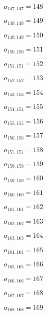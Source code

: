 \documentclass[a4paper,12pt]{article}
\begin{document}
$a _{ 147, 147 } = 148$

$a _{ 148, 148 } = 149$

$a _{ 149, 149 } = 150$

$a _{ 150, 150 } = 151$

$a _{ 151, 151 } = 152$

$a _{ 152, 152 } = 153$

$a _{ 153, 153 } = 154$

$a _{ 154, 154 } = 155$

$a _{ 155, 155 } = 156$

$a _{ 156, 156 } = 157$

$a _{ 157, 157 } = 158$

$a _{ 158, 158 } = 159$

$a _{ 159, 159 } = 160$

$a _{ 160, 160 } = 161$

$a _{ 161, 161 } = 162$

$a _{ 162, 162 } = 163$

$a _{ 163, 163 } = 164$

$a _{ 164, 164 } = 165$

$a _{ 165, 165 } = 166$

$a _{ 166, 166 } = 167$

$a _{ 167, 167 } = 168$

$a _{ 168, 168 } = 169$
\end{document}
